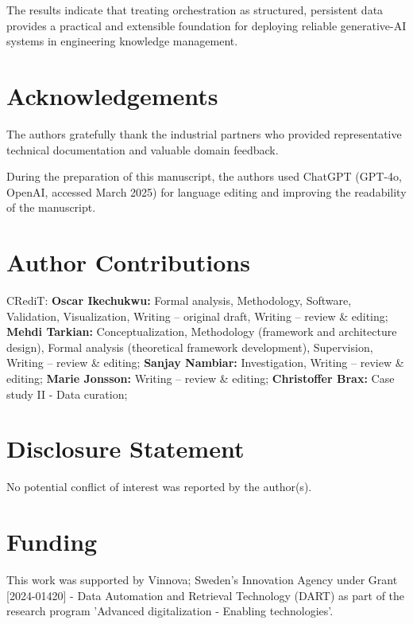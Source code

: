 \documentclass[largeformat]{interact}
\begin{document}
The results indicate that treating orchestration as structured, persistent data provides a practical and extensible foundation for deploying reliable generative-AI systems in engineering knowledge management.


\section*{Acknowledgements}
The authors gratefully thank the industrial partners who provided representative technical documentation and valuable domain feedback.

\noindent During the preparation of this manuscript, the authors used ChatGPT (GPT-4o, OpenAI, accessed March 2025) for language editing and improving the readability of the manuscript.
\section*{Author Contributions}
CRediT: \textbf{Oscar Ikechukwu:} Formal analysis, Methodology, Software, Validation, Visualization, Writing -- original draft, Writing -- review \& editing; \textbf{Mehdi Tarkian:} Conceptualization, Methodology (framework and architecture design), Formal analysis (theoretical framework development), Supervision, Writing -- review \& editing; \textbf{Sanjay Nambiar:} Investigation, Writing -- review \& editing; \textbf{Marie Jonsson:} Writing -- review \& editing; \textbf{Christoffer Brax:} Case study II - Data curation;

\section*{Disclosure Statement}
No potential conflict of interest was reported by the author(s).
\section*{Funding}
\noindent This work was supported by Vinnova; Sweden's Innovation Agency under Grant [2024-01420] - Data Automation and Retrieval Technology (DART) as part of the research program 'Advanced digitalization - Enabling technologies'.
\end{document}
